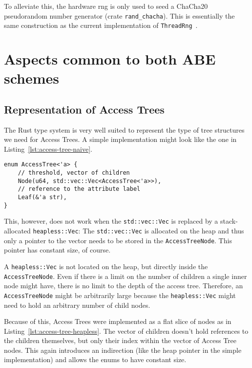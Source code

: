 To alleviate this, the hardware \acrshort{rng} is only used to seed a ChaCha20 pseudorandom number generator (crate \texttt{rand\_chacha}).
This is essentially the same construction as the current implementation of \texttt{ThreadRng}~\cite{noauthor_rust_nodate}.

\section{Aspects common to both ABE schemes}

\subsection{Representation of Access Trees}
The Rust type system is very well suited to represent the type of tree structures we need for Access Trees.
A simple implementation might look like the one in Listing~\ref{lst:access-tree-naive}. 

\begin{lstlisting}[caption={Simple Implementation of Access Trees (using the standard library)},label={lst:access-tree-naive}]
enum AccessTree<'a> {
    // threshold, vector of children
    Node(u64, std::vec::Vec<AccessTree<'a>>),
    // reference to the attribute label
    Leaf(&'a str),
}
\end{lstlisting}

This, however, does not work when the \texttt{std::vec::Vec} is replaced by a stack-allocated \texttt{heapless::Vec}:
The \texttt{std::vec::Vec} is allocated on the heap and thus only a pointer to the vector needs to be stored in the \texttt{AccessTreeNode}.
This pointer has constant size, of course.

A \texttt{heapless::Vec} is not located on the heap, but directly inside the \texttt{AccessTreeNode}.
Even if there is a limit on the number of children a single inner node might have, there is no limit to the depth of the access tree.
Therefore, an \texttt{AccessTreeNode} might be arbitrarily large because the \texttt{heapless::Vec} might need to hold an arbitrary number of child nodes.

Because of this, Access Trees were implemented as a flat slice of nodes as in Listing~\ref{lst:access-tree-heapless}. 
The vector of children doesn't hold references to the children themselves, but only their index within the vector of Access Tree nodes.
This again introduces an indirection (like the heap pointer in the simple implementation) and allows the enums to have constant size.

